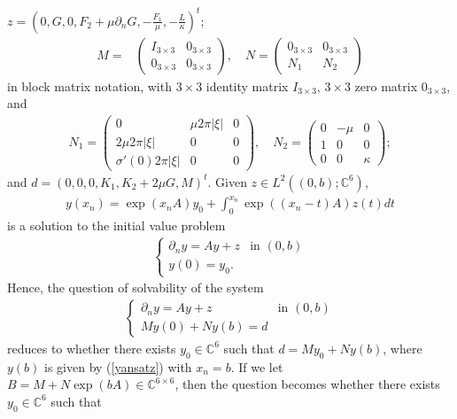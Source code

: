 \documentclass[11pt,letterpaper,reqno]{amsart}
\numberwithin{equation}{section}
\newcommand{\abs}[1]{\left\lvert#1\right\rvert}
\begin{document}
\(z=(0,G,0,F_{2}+\mu\partial_{n}G,-\frac{F_{1}}{\mu},-\frac{L}{\kappa})^{t}\);
\begin{align}
    M=&
    \begin{pmatrix}
        I_{3 \times 3} & 0_{3 \times 3} \\
        0_{3 \times 3} & 0_{3 \times 3}
    \end{pmatrix}
    , \quad N=
    \begin{pmatrix}
        0_{3 \times 3} & 0_{3 \times 3} \\
        N_{1} & N_{2}
    \end{pmatrix}
\end{align}
in block matrix notation, with \(3\times 3\) identity matrix \(I_{3 \times 3}\), \(3 \times 3\) zero matrix \(0_{3 \times 3}\), and 
\begin{align}
    N_{1}=
    \begin{pmatrix}
        0 & \mu 2\pi\abs{\xi} & 0 \\
        2\mu 2\pi \abs{\xi} & 0 & 0 \\
        \sigma'(0)2\pi \abs{\xi} & 0 & 0
    \end{pmatrix}
    , \quad N_{2}=
    \begin{pmatrix}
        0 & -\mu & 0 \\
        1 & 0 & 0 \\
        0 & 0 & \kappa
    \end{pmatrix}
    ;
\end{align}
and \(d=(0,0,0,K_{1},K_{2}+2\mu G,M)^{t}\). Given \(z \in L^{2}((0,b); \mathbb{C}^{6})\),
\begin{align} \label{yansatz}
    y(x_{n})=\exp(x_{n}A)y_{0} +\int_{0}^{x_{n}}\exp((x_{n}-t)A)z(t)dt
\end{align}
is a solution to the initial value problem
\begin{align}
    \begin{cases}
        \partial_{n}y = Ay+z &\mbox{in \((0,b)\)} \\
        y(0) = y_{0}.
    \end{cases}
\end{align}
Hence, the question of solvability of the system
\begin{align} \label{ode}
    \begin{cases}
        \partial_{n}y=Ay+z &\mbox{in \((0,b)\)} \\
        My(0)+Ny(b)=d
    \end{cases}
\end{align}
reduces to whether there exists \(y_{0} \in \mathbb{C}^{6}\) such that \(d=My_{0}+Ny(b)\), where \(y(b)\) is given by (\ref{yansatz}) with \(x_{n}=b\). If we let \(B=M+N\exp(bA) \in \mathbb{C}^{6 \times 6}\), then the question becomes whether there exists \(y_{0} \in \mathbb{C}^{6}\) such that
\end{document}
